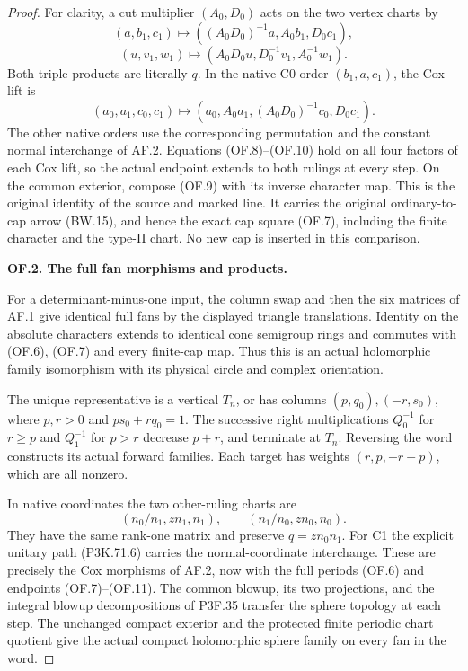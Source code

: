 \begin{proof}
For clarity, a cut multiplier \((A_0,D_0)\) acts on the two
vertex charts by
\[
 (a,b_1,c_1)\longmapsto((A_0D_0)^{-1}a,A_0b_1,D_0c_1),
\]
\[
 (u,v_1,w_1)\longmapsto(A_0D_0u,D_0^{-1}v_1,A_0^{-1}w_1).
 \tag{OF.10}
\]
Both triple products are literally \(q\). In the native C0
order \((b_1,a,c_1)\), the Cox lift is
\[
 (a_0,a_1,c_0,c_1)\longmapsto
 (a_0,A_0a_1,(A_0D_0)^{-1}c_0,D_0c_1).             \tag{OF.11}
\]
The other native orders use the corresponding permutation
and the constant normal interchange of AF.2. Equations
(OF.8)--(OF.10) hold on all four factors of each Cox lift,
so the actual endpoint extends to both rulings at every step.
On the common exterior, compose (OF.9) with its inverse
character map. This is the original identity of the source
and marked line. It carries the original ordinary-to-cap
arrow (BW.15), and hence the exact cap square (OF.7), including
the finite character and the type-II chart. No new cap is
inserted in this comparison.

\par\medskip\noindent\textbf{OF.2. The full fan morphisms and products.}\par\nopagebreak[4]
For a determinant-minus-one input, the column swap and then
the six matrices of AF.1 give identical full fans by the
displayed triangle translations. Identity on the absolute
characters extends to identical cone semigroup rings and
commutes with (OF.6), (OF.7) and every finite-cap map.
Thus this is an actual holomorphic family isomorphism with
its physical circle and complex orientation.

The unique representative is a vertical \(T_n\), or has
columns \((p,q_0),(-r,s_0)\), where \(p,r>0\) and
\(ps_0+rq_0=1\). The successive right multiplications
\(Q_0^{-1}\) for \(r\ge p\) and \(Q_1^{-1}\) for \(p>r\)
decrease \(p+r\), and terminate at \(T_n\). Reversing the
word constructs its actual forward families. Each target
has weights \((r,p,-r-p)\), which are all nonzero.

In native coordinates the two other-ruling charts are
\[
 (n_0/n_1,zn_1,n_1),\qquad(n_1/n_0,zn_0,n_0).
 \tag{OF.12}
\]
They have the same rank-one matrix and preserve
\(q=zn_0n_1\). For C1 the explicit unitary path
(P3K.71.6) carries the normal-coordinate interchange. These
are precisely the Cox morphisms of AF.2, now with the full
periods (OF.6) and endpoints (OF.7)--(OF.11). The common
blowup, its two projections, and the integral blowup
decompositions of P3F.35 transfer the sphere topology at each step.
The unchanged compact exterior and the protected finite
periodic chart quotient give the actual compact holomorphic
sphere family on every fan in the word.


\end{proof}
